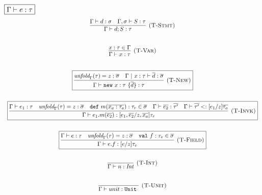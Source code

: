\documentclass{article}
\newcommand{\keywadj}[1]{\mathtt{#1}}
\newcommand{\keyw}[1]{\keywadj{#1}~}
\begin{document}
$\fbox{$\Gamma \vdash e : \tau$}$
\[
\begin{array}{c}
\infer[\textsc{(T-Stmt)}]
  {\Gamma \vdash d; S : \tau}
  {\Gamma \vdash d : \sigma & \Gamma, \sigma \vdash S : \tau}\\[5ex]
  
\infer[\textsc{(T-Var)}]
  {\Gamma \vdash x : \tau}
  {x : \tau \in \Gamma}\\[5ex]

\boxed{\infer[\textsc{(T-New)}]
	{\Gamma \vdash \keywadj{new}~x:\tau~\{\overline{d}\} : \tau}
	{\textit{unfold}_\Gamma(\tau) = z:\overline{\sigma} & \Gamma ~|~ x:\tau \vdash \overline{d} : \overline{\sigma}}
}\\[5ex]

	
\boxed{\infer[\textsc{(T-Invk)}]
	{\Gamma \vdash e_1.m(\overline{e_2}) : [e_1,\overline{e_2}/z,\overline{x_a}]\tau_r} 
	{\Gamma \vdash e_1 : \tau & \textit{unfold}_\Gamma(\tau) = z:\overline{\sigma} & \keyw{def} m (\overline{x_a: \tau_a}):\tau_r \in \overline{\sigma} & \Gamma \vdash \overline{e_2} : \overline{\tau'} & \Gamma \vdash \overline{\tau'} <: [e_1/z]\overline{\tau_a}}
}\\[5ex]

	
\boxed{\infer[\textsc{(T-Field)}]
	{\Gamma \vdash e.f : [e/z]\tau_v} 
	{\Gamma \vdash e: \tau & \textit{unfold}_\Gamma(\tau) = z:\overline{\sigma} & \keyw{val} f : \tau_v \in \overline{\sigma}}
}\\[5ex]

\infer[\textsc{(T-Int)}]
  {\Gamma \vdash n : \textit{Int}}
  {}\\[5ex]
  
\infer[\textsc{(T-Unit)}]
  {\Gamma \vdash unit : \keyw{Unit}}
  {}\\[5ex]
\end{array}
\]
\end{document}
